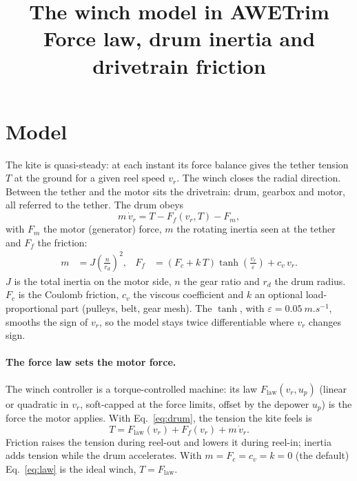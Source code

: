 \documentclass[11pt,a4paper]{article}
\title{\vspace{-1.5cm}\textbf{The winch model in AWETrim}\\[4pt]
  \large Force law, drum inertia and drivetrain friction}
\date{}
\begin{document}
\maketitle
\vspace{-1.2cm}

\section{Model}

The kite is quasi-steady: at each instant its force balance gives the tether
tension $T$ at the ground for a given reel speed $v_r$. The winch closes the
radial direction. Between the tether and the motor sits the drivetrain: drum,
gearbox and motor, all referred to the tether. The drum obeys
\begin{equation}
  m\,\dot v_r = T - F_f(v_r, T) - F_m ,
  \label{eq:drum}
\end{equation}
with $F_m$ the motor (generator) force, $m$ the rotating inertia seen at the
tether and $F_f$ the friction:
\begin{align}
  m &= J \left(\frac{n}{r_d}\right)^{2}, &
  F_f &= (F_c + k\,T)\tanh\!\left(\frac{v_r}{\varepsilon}\right) + c_v\, v_r .
  \label{eq:params}
\end{align}
$J$ is the total inertia on the motor side, $n$ the gear ratio and $r_d$ the
drum radius. $F_c$ is the Coulomb friction, $c_v$ the viscous coefficient and
$k$ an optional load-proportional part (pulleys, belt, gear mesh). The $\tanh$,
with $\varepsilon = \SI{0.05}{m.s^{-1}}$, smooths the sign of $v_r$, so the
model stays twice differentiable where $v_r$ changes sign.

\paragraph{The force law sets the motor force.} The winch controller is a
torque-controlled machine: its law $F_\mathrm{law}(v_r, u_p)$ (linear or
quadratic in $v_r$, soft-capped at the force limits, offset by the depower
$u_p$) is the force the motor applies. With Eq.~\eqref{eq:drum}, the tension
the kite feels is
\begin{equation}
  T = F_\mathrm{law}(v_r) + F_f(v_r) + m\,\dot v_r .
  \label{eq:law}
\end{equation}
Friction raises the tension during reel-out and lowers it during reel-in;
inertia adds tension while the drum accelerates. With $m = F_c = c_v = k = 0$
(the default) Eq.~\eqref{eq:law} is the ideal winch, $T = F_\mathrm{law}$.
\end{document}
